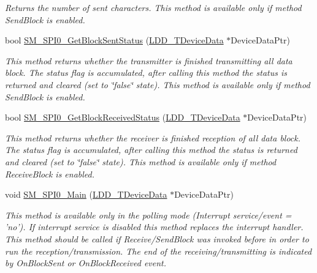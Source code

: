 \begin{DoxyCompactItemize}
\begin{DoxyCompactList}\small\item\em Returns the number of sent characters. This method is available only if method Send\-Block is enabled. \end{DoxyCompactList}\item 
bool \hyperlink{group___s_m___s_p_i0__module_ga1a6a0245b47ffaa280d5286978cfb1c2}{S\-M\-\_\-\-S\-P\-I0\-\_\-\-Get\-Block\-Sent\-Status} (\hyperlink{group___p_e___types__module_gac5cf1362f1f0e3a2ce71b1bf2276d091}{L\-D\-D\-\_\-\-T\-Device\-Data} $\ast$Device\-Data\-Ptr)
\begin{DoxyCompactList}\small\item\em This method returns whether the transmitter is finished transmitting all data block. The status flag is accumulated, after calling this method the status is returned and cleared (set to \char`\"{}false\char`\"{} state). This method is available only if method Send\-Block is enabled. \end{DoxyCompactList}\item 
bool \hyperlink{group___s_m___s_p_i0__module_ga5a3ff4fcd27616aba262631313bafd97}{S\-M\-\_\-\-S\-P\-I0\-\_\-\-Get\-Block\-Received\-Status} (\hyperlink{group___p_e___types__module_gac5cf1362f1f0e3a2ce71b1bf2276d091}{L\-D\-D\-\_\-\-T\-Device\-Data} $\ast$Device\-Data\-Ptr)
\begin{DoxyCompactList}\small\item\em This method returns whether the receiver is finished reception of all data block. The status flag is accumulated, after calling this method the status is returned and cleared (set to \char`\"{}false\char`\"{} state). This method is available only if method Receive\-Block is enabled. \end{DoxyCompactList}\item 
void \hyperlink{group___s_m___s_p_i0__module_ga9b4318e9ea51a4ef1ed0dd4ecf114d39}{S\-M\-\_\-\-S\-P\-I0\-\_\-\-Main} (\hyperlink{group___p_e___types__module_gac5cf1362f1f0e3a2ce71b1bf2276d091}{L\-D\-D\-\_\-\-T\-Device\-Data} $\ast$Device\-Data\-Ptr)
\begin{DoxyCompactList}\small\item\em This method is available only in the polling mode (Interrupt service/event = 'no'). If interrupt service is disabled this method replaces the interrupt handler. This method should be called if Receive/\-Send\-Block was invoked before in order to run the reception/transmission. The end of the receiving/transmitting is indicated by On\-Block\-Sent or On\-Block\-Received event. \end{DoxyCompactList}\end{DoxyCompactItemize}


